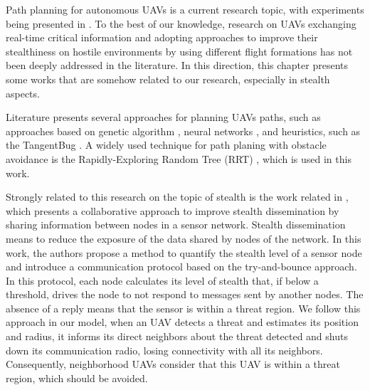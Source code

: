 
Path planning for autonomous UAVs is a current research topic, with experiments being presented in \cite{chen_2016, silva_2017, radmanesh_2016, lu_2017}. To the best of our knowledge, research on UAVs exchanging real-time critical information and adopting approaches to improve their stealthiness on hostile environments by using different flight formations has not been deeply addressed in the literature. In this direction, this chapter presents some works that are somehow related to our research, especially in stealth aspects.

Literature presents several approaches for planning UAVs paths, such as approaches based on genetic algorithm \cite{he_2013}, neural networks \cite{glasius_1995}, and heuristics, such as the TangentBug \cite{breitenmoser2010}. A widely used technique for path planing with obstacle avoidance \cite{wzorek_2006, kothari_2009, zhen_2014, wen_2017, lu_2017} is the Rapidly-Exploring Random Tree (RRT) \cite{lavalle_1998}, which is used in this work.

Strongly related to this research on the topic of stealth is the work related in \cite{turgut_2009}, which presents a collaborative approach to improve stealth dissemination by sharing information between nodes in a sensor network. Stealth dissemination means to reduce the exposure of the data shared by nodes of the network. In this work, the authors propose a method to quantify the stealth level of a sensor node and introduce a communication protocol based on the try-and-bounce approach. In this protocol, each node calculates its level of stealth that, if below a threshold, drives the node to not respond to messages sent by another nodes. The absence of a reply means that the sensor is within a threat region. We follow this approach in our model, when an UAV detects a threat and estimates its position and radius, it informs its direct neighbors about the threat detected and shuts down its communication radio, losing connectivity with all its neighbors. Consequently, neighborhood UAVs consider that this UAV is within a threat region, which should be avoided.

